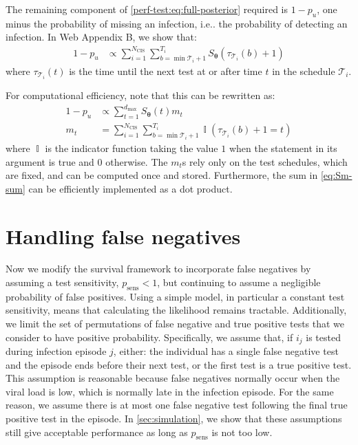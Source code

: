 \documentclass[referee,useAMS,usenatbib]{biom}
\makeatletter
\DeclareMathOperator{\indicator}{\mathbb{I}}
\renewcommand{\vec}[1]{\bm{#1}}
\newcommand{\dmax}{d_\text{max}}
\newcommand{\psens}{p_\text{sens}}
\newcommand{\Ncis}{N_\text{CIS}}
\newcommand{\sched}{\mathcal{T}}
\DeclareRobustCommand\onedot{\futurelet\@let@token\@onedot}
\def\@onedot{\ifx\@let@token.\else.\null\fi\xspace}
\def\ie{i.e\onedot} \def\Ie{{I.e}\onedot}
\makeatother
\begin{document}
The remaining component of \cref{perf-test:eq:full-posterior} required is $1- p_u$, one minus the probability of missing an infection, \ie the probability of detecting an infection.
In Web Appendix B, we show that:
\begin{align}
  1 - p_u
  &\propto \sum_{i=1}^{\Ncis}\sum_{b = \min \sched_{i} + 1}^{T_{i}} S_{\vec{\theta}}(\tau_{\sched_{i}}(b) + 1)
  \label{eq:1minuspu}
\end{align}
where $\tau_{\sched_i}(t)$ is the time until the next test at or after time $t$ in the schedule $\sched_i$.

For computational efficiency, note that this can be rewritten as:
\begin{align}
  1- p_u
  &\propto \sum_{t=1}^{\dmax} S_{\vec\theta}(t) m_t
  \label{eq:Sm-sum} \\
  m_t &= \sum_{i=1}^{\Ncis} \sum_{b = \min \sched_{i} + 1}^{T_{i}} \indicator(\tau_{\sched_{i}}(b) + 1 = t)
\end{align}
where $\indicator$ is the indicator function taking the value $1$ when the statement in its argument is true and $0$ otherwise.
The $m_t$s rely only on the test schedules, which are fixed, and can be computed once and stored.
Furthermore, the sum in \cref{eq:Sm-sum} can be efficiently implemented as a dot product.

\section{Handling false negatives} \label{sec:false-negatives}

Now we modify the survival framework to incorporate false negatives by assuming a test sensitivity, $\psens < 1$, but continuing to assume a negligible probability of false positives.
Using a simple model, in particular a constant test sensitivity, means that calculating the likelihood remains tractable.
Additionally, we limit the set of permutations of false negative and true positive tests that we consider to have positive probability.
Specifically, we assume that, if $i_j$ is tested during infection episode $j$, either: the individual has a single false negative test and the episode ends before their next test, or the first test is a true positive test.
This assumption is reasonable because false negatives normally occur when the viral load is low, which is normally late in the infection episode.
For the same reason, we assume there is at most one false negative test following the final true positive test in the episode.
In \cref{sec:simulation}, we show that these assumptions still give acceptable performance as long as $\psens$ is not too low.
\end{document}
